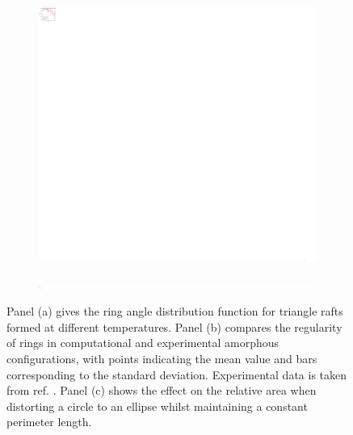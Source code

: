 \begin{figure}[bt]
     \begin{subfigure}[b]{0.45\textwidth}
         \centering
         \includegraphics[width=\textwidth]{./figures/bilayers/tri_raft_area.pdf}
         \caption{}
         \label{fig:trarea}
     \end{subfigure}
     \hfill
     \begin{subfigure}[b]{0.45\textwidth}
         \centering
         \includegraphics[width=\textwidth]{./figures/bilayers/ellipse_area.pdf}
         \caption{}
         \label{fig:trellipse}
     \end{subfigure}
     \hfill

     \caption{Panel (a) gives the ring angle distribution function for triangle rafts formed at different temperatures. Panel (b) compares the regularity of rings in computational and experimental amorphous configurations, with points indicating the mean value and bars corresponding to the standard deviation. Experimental data is taken from ref. \cite{Kumar2014}. Panel (c) shows the effect on the relative area when distorting a circle to an ellipse whilst maintaining a constant perimeter length.}
     \label{fig:trangarea}
\end{figure}

